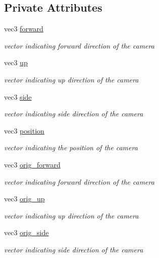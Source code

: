 \subsection*{Private Attributes}
\begin{DoxyCompactItemize}
\item 
vec3 \mbox{\hyperlink{classCamera_a8bc7972da69be47469f8ee52b6647fe0}{forward}}
\begin{DoxyCompactList}\small\item\em vector indicating forward direction of the camera \end{DoxyCompactList}\item 
vec3 \mbox{\hyperlink{classCamera_aff4fd1aa62994840f7742b698f15313e}{up}}
\begin{DoxyCompactList}\small\item\em vector indicating up direction of the camera \end{DoxyCompactList}\item 
vec3 \mbox{\hyperlink{classCamera_a933d8f284b441a9baf9357a597006b12}{side}}
\begin{DoxyCompactList}\small\item\em vector indicating side direction of the camera \end{DoxyCompactList}\item 
vec3 \mbox{\hyperlink{classCamera_a6bd96884fb5fb652b71042f2d7f0122c}{position}}
\begin{DoxyCompactList}\small\item\em vector indicating the position of the camera \end{DoxyCompactList}\item 
vec3 \mbox{\hyperlink{classCamera_ab48d54798c32b71018ad474085f773d7}{orig\+\_\+forward}}
\begin{DoxyCompactList}\small\item\em vector indicating forward direction of the camera \end{DoxyCompactList}\item 
vec3 \mbox{\hyperlink{classCamera_a526c419473d3a8a22011644399520d9a}{orig\+\_\+up}}
\begin{DoxyCompactList}\small\item\em vector indicating up direction of the camera \end{DoxyCompactList}\item 
vec3 \mbox{\hyperlink{classCamera_a23882638c942fb89d6a307a3478eb76e}{orig\+\_\+side}}
\begin{DoxyCompactList}\small\item\em vector indicating side direction of the camera \end{DoxyCompactList}\item 

\end{DoxyCompactItemize}
